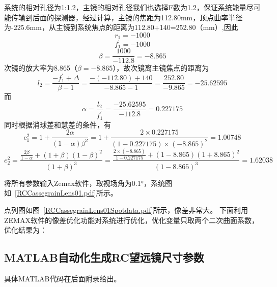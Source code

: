 系统的相对孔径为1:1.2，主镜的相对孔径我们也选择F数为1.2，保证系统能量尽可能传输到后面的探测器，经过计算，主镜的焦距为112.80mm，顶点曲率半径为-225.6mm，从主镜到系统焦点的距离为112.80+140=252.80（mm）,因此
$$ r_1=-1000 $$
$$ f_1 ^{'}=-1000 $$
$$
\beta=\dfrac{1000}{-112.8}=-8.865
$$
次镜的放大率为8.865（$\beta = - 8.865$），故次镜离主镜焦点的距离为
$$ l _ { 2 } = \frac { - f _ { 1 } ^ { \prime } + \Delta } { \beta - 1 } = \frac { - ( - 112.80 ) + 140 } { - 8.865 - 1 } = \frac { 252.80 } { - 9.865 } = - 25.62595 $$
而
$$ \alpha = \frac { l _ { 2 } } { f _ { 1 } ^ { \prime } } = \frac { - 25.62595 } { - 112.8 } =0.227175 $$
同时根据消球差和慧差的条件，有
$$ \mathrm { e } _ { 1 } ^ { 2 } = 1 + \frac { 2 \alpha } { ( 1 - \alpha ) \beta ^ { 2 } } = 1 + \frac { 2 \times 0.227175 } { ( 1 - 0.227175 ) \times ( - 8.865 ) ^ { 2 } } = 1.00748 $$
$$ e _ { 2 } ^ { 2 } = \frac { \frac { 2 \beta } { 1 - \alpha } + ( 1 + \beta ) ( 1 - \beta ) ^ { 2 } } { ( 1 + \beta ) ^ { 3 } } = \frac { \frac { 2 \times ( - 8.865 ) } { 1 - 0.227175 } + ( 1 - 8.865 ) ( 1 + 8.865 ) ^ { 2 } } { ( 1 - 8.865 ) ^ { 3 } } =1.62038 $$

将所有参数输入Zemax软件，取视场角为0.1°，系统图如~\ref{RCCassegrainLens01.pdf}所示。



点列图如图~\ref{RCCassegrainLens01Spotdata.pdf}所示，像差非常大。
下面利用ZEMAX软件的像差优化功能对系统进行优化，优化变量只取两个二次曲面系数，优化结果为：


\subsection{MATLAB自动化生成RC望远镜尺寸参数}

具体MATLAB代码在后面附录给出。

